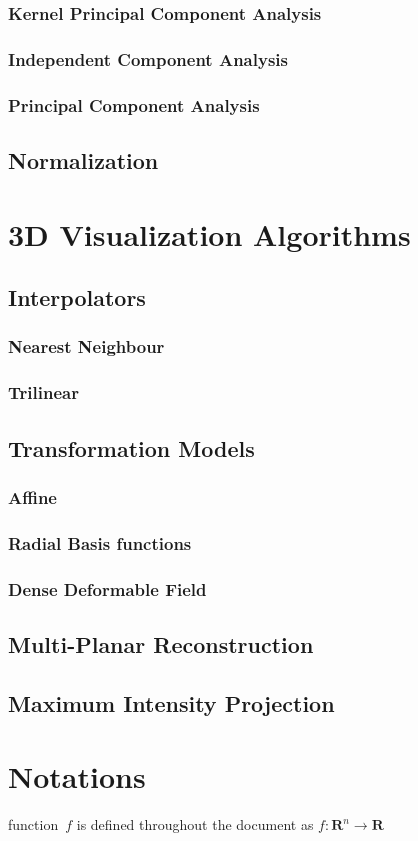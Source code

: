 \documentclass[11pt]{article}
\begin{document}
\subsubsection{Kernel Principal Component Analysis}
\subsubsection{Independent Component Analysis}
\subsubsection{Principal Component Analysis}
\subsection{Normalization}


\section{3D Visualization Algorithms}
\subsection{Interpolators}
\subsubsection{Nearest Neighbour}
\subsubsection{Trilinear}
\subsection{Transformation Models}
\subsubsection{Affine}
\subsubsection{Radial Basis functions}
\subsubsection{Dense Deformable Field}
\subsection{Multi-Planar Reconstruction}
\subsection{Maximum Intensity Projection}

\section{Notations}
function~$f$ is defined throughout the document as $f \colon \textbf{R}^n \to \textbf{R}$



\end{document}
